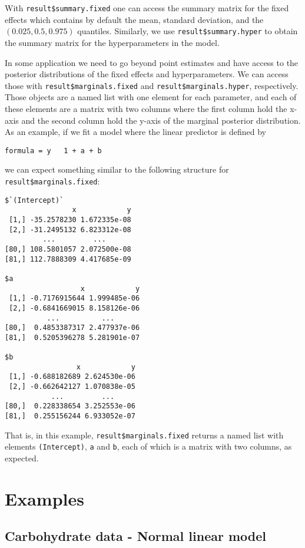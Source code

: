 \documentclass[a4paper,11pt]{report}
\newcommand{\tv}{\texttt}
\begin{document}
With \tv{result\$summary.fixed} one can access the summary matrix for
the fixed effects which contains by default the mean, standard
deviation, and the $(0.025, 0.5, 0.975)$ quantiles. Similarly, we use
\tv{result\$summary.hyper} to obtain the summary matrix for the
hyperparameters in the model.

In some application we need to go beyond point estimates and have
access to the posterior distributions of the fixed effects and
hyperparameters.  We can access those with
\tv{result\$marginals.fixed} and \tv{result\$marginals.hyper},
respectively. Those objects are a named list with one element for each
parameter, and each of these elements are a matrix with two columns
where the first column hold the x-axis and the second column hold the
y-axis of the marginal posterior distribution. As an example, if we
fit a model where the linear predictor is defined by
\begin{center}
\tv{formula = y ~ 1 + a + b}
\end{center}
we can expect something similar to the following structure for 
\tv{result\$marginals.fixed}:

\small{
\begin{verbatim}
$`(Intercept)`
                x            y
 [1,] -35.2578230 1.672335e-08
 [2,] -31.2495132 6.823312e-08
         ...         ...
[80,] 108.5801057 2.072500e-08
[81,] 112.7888309 4.417685e-09

$a
                  x            y
 [1,] -0.7176915644 1.999485e-06
 [2,] -0.6841669015 8.158126e-06
          ...          ...
[80,]  0.4853387317 2.477937e-06
[81,]  0.5205396278 5.281901e-07

$b
                 x            y
 [1,] -0.688182689 2.624530e-06
 [2,] -0.662642127 1.070838e-05
           ...         ...
[80,]  0.228338654 3.252553e-06
[81,]  0.255156244 6.933052e-07
\end{verbatim}
}
\noindent That is, in this example, \tv{result\$marginals.fixed}
returns a named list with elements \tv{(Intercept)}, \tv{a} and
\tv{b}, each of which is a matrix with two columns, as expected.


\section{Examples}\label{bglm:sec:examples}

\subsection{Carbohydrate data - Normal linear model}
\end{document}
